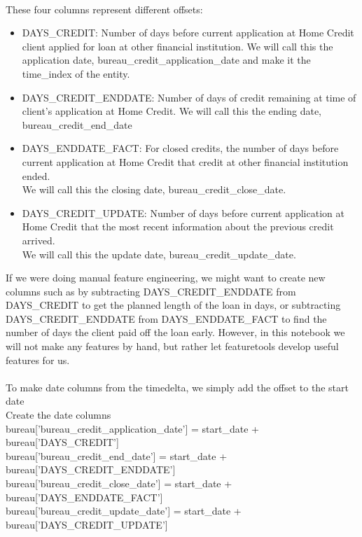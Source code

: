 \documentclass[twoside,a4paper]{article}
\begin{document}
\\These four columns represent different offsets:\\




\begin{itemize}
 \item DAYS\_CREDIT: Number of days before current application at Home Credit client applied for loan at other financial institution. We will call this the application date, bureau\_credit\_application\_date and make it the time\_index of the entity.

 \item DAYS\_CREDIT\_ENDDATE: Number of days of credit remaining at time of client's application at Home Credit. We will call this the ending date, bureau\_credit\_end\_date

 \item DAYS\_ENDDATE\_FACT: For closed credits, the number of days before current application at Home Credit that credit at other financial institution ended.\\We will call this the closing date, bureau\_credit\_close\_date.

 \item DAYS\_CREDIT\_UPDATE: Number of days before current application at Home Credit that the most recent information about the previous credit arrived.\\We will call this the update date, bureau\_credit\_update\_date.\\
\end{itemize}
If we were doing manual feature engineering, we might want to create new columns such as by subtracting DAYS\_CREDIT\_ENDDATE from DAYS\_CREDIT to get the planned length of the loan in days, or subtracting DAYS\_CREDIT\_ENDDATE from DAYS\_ENDDATE\_FACT to find the number of days the client paid off the loan early. However, in this notebook we will not make any features by hand, but rather let featuretools develop useful features for us.\\\\To make date columns from the timedelta, we simply add the offset to the start date\\
 Create the date columns\\
bureau['bureau\_credit\_application\_date'] = start\_date + bureau['DAYS\_CREDIT']\\
bureau['bureau\_credit\_end\_date'] = start\_date + bureau['DAYS\_CREDIT\_ENDDATE']\\
bureau['bureau\_credit\_close\_date'] = start\_date + bureau['DAYS\_ENDDATE\_FACT']\\
bureau['bureau\_credit\_update\_date'] = start\_date + bureau['DAYS\_CREDIT\_UPDATE']\\
\end{document}

